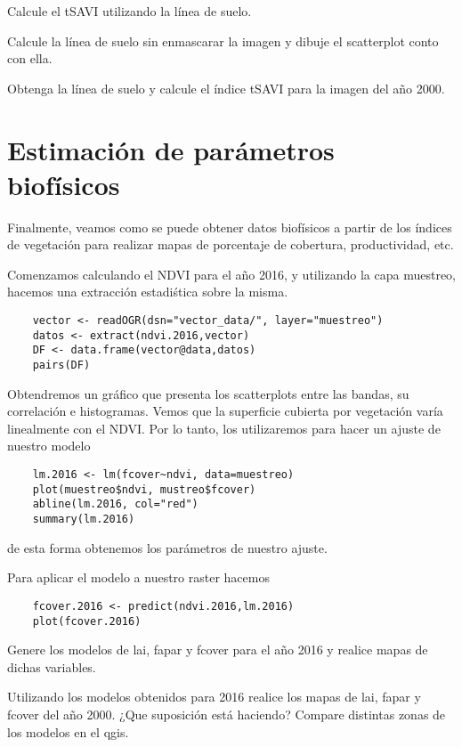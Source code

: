 \begin{act}
    Calcule el tSAVI utilizando la l\'inea de suelo.
\end{act}

\begin{act}
    Calcule la l\'inea de suelo sin enmascarar la imagen y dibuje el
    scatterplot conto con ella.
\end{act}

\begin{act}
    Obtenga la l\'inea de suelo y calcule el \'indice tSAVI para la imagen del año
    2000.
\end{act}

\section{Estimaci\'on de par\'ametros biof\'isicos}

Finalmente, veamos como se puede obtener datos biof\'isicos a partir de los
\'indices de vegetaci\'on para realizar mapas de
porcentaje de cobertura, productividad, etc.

\begin{exa}
    Comenzamos calculando el NDVI para el año 2016, y utilizando la capa
    muestreo, hacemos una extracci\'on estadi\'stica sobre la misma.
    \begin{lstlisting}
    vector <- readOGR(dsn="vector_data/", layer="muestreo")
    datos <- extract(ndvi.2016,vector)
    DF <- data.frame(vector@data,datos)
    pairs(DF)
    \end{lstlisting}

    Obtendremos un gr\'afico que presenta los scatterplots entre las bandas, su
    correlaci\'on e histogramas.
    Vemos que la superficie cubierta por vegetaci\'on var\'ia
    linealmente con el NDVI\@. Por lo tanto, los utilizaremos para hacer un ajuste de nuestro modelo

    \begin{lstlisting}
    lm.2016 <- lm(fcover~ndvi, data=muestreo)
    plot(muestreo$ndvi, mustreo$fcover)
    abline(lm.2016, col="red")
    summary(lm.2016)
    \end{lstlisting}

    de esta forma obtenemos los par\'ametros de nuestro ajuste.

    Para aplicar el modelo a nuestro raster hacemos
    \begin{lstlisting}
    fcover.2016 <- predict(ndvi.2016,lm.2016)
    plot(fcover.2016)
    \end{lstlisting}
\end{exa}

\begin{act}
    Genere los modelos de lai, fapar y fcover para el año 2016 y
    realice mapas de dichas variables.
\end{act}

\begin{act}
    Utilizando los modelos obtenidos para 2016 realice
    los mapas de lai, fapar y fcover del año 2000. ¿Que suposici\'on est\'a
    haciendo? Compare distintas zonas de los modelos en el qgis.
\end{act}
